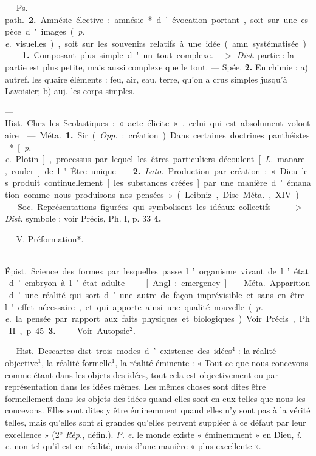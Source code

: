 \begin{itemize}[leftmargin=1cm, label=, itemsep=1pt]
— \si{Ps. path.} {\bf 2.} Amnésie élective :
amnésie* d’évocation portant, soit
sur une espèce d'images ({\it p. e.} visuelles), soit sur les souvenirs relatifs
à une idée (amn. systématisée).

 — {\bf 1.} Composant plus simple
d'un tout complexe. $->$ {\it Dist.}
partie : la partie est plus petite,
mais aussi complexe que le tout. —
Spée. {\bf 2.} En chimie : a) autref. les
quaire éléments : feu, air, eau, terre,
qu’on a crus simples jusqu’à Lavoisier; b) auj. les corps simples.

 — \si{Hist.} Chez les Scolastiques :
« acte élicite », celui qui est absolument volontaire.

 — \si{Méta.} {\bf 1.} Sir. ({\it Opp.} :
création). Dans certaines doctrines
panthéistes* [{\it p. e.} Plotin], processus
par lequel les êtres particuliers
découlent [{\it L.} manare, couler] de
l'Être unique. — {\bf 2.} {\it Lato.} Production par création : « Dieu les produit
continuellement [les substances
créées] par une manière d'émanation comme nous produisons nos
pensées» (Leibniz, Disc. \si{Méta.}, XIV).

 — \si{Soc.} Représentations
figurées qui symbolisent les idéaux
collectifs. — $->$ {\it Dist.} symbole :
voir Précis, Ph. I, p. 33 {\bf 4.}

 — V. Préformation*.

 — \si{Épist.} Science des
formes par lesquelles passe l’organisme vivant de l’état d’embryon à
l’état adulte.

 — [Angl. : emergency] —
\si{Méta.} Apparition d’une réalité qui
sort d’une autre de façon imprévisible et sans en être l'effet nécessaire, et qui apporte ainsi une qualité nouvelle ({\it p. e.} la pensée par rapport aux faits physiques et biologiques). Voir Précis, Ph. II, p. 45 {\bf 3.}

 — Voir Autopsie$^2$.

 — \si{Hist.} Descartes dist. trois
modes d’existence des idées$^4$ : la
réalité objective$^1$, la réalité formelle$^1$,
la réalité éminente : « Tout ce que
nous concevons comme étant dans
les objets des idées, tout cela est
objectivement ou par représentation
dans les idées mêmes. Les mêmes
choses sont dites être formellement
dans les objets des idées quand elles
sont en eux telles que nous les concevons. Elles sont dites y être éminemment quand elles n’y sont pas
à la vérité telles, mais qu’elles sont
si grandes qu’elles peuvent suppléer
à ce défaut par leur excellence »
(2° {\it Rép.}, défin.). {\it P. e.} le monde existe
« éminemment » en Dieu, {\it i. e.} non
tel qu’il est en réalité, mais d’une
manière « plus excellente ».


\end{itemize}
